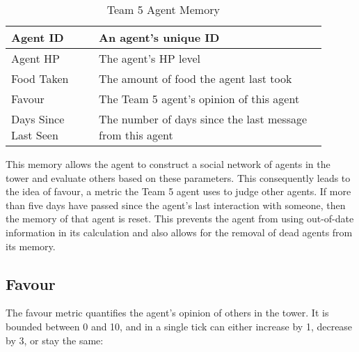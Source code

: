 \begin{table}
    \centering
    \begin{tabular}%
        {| >{\raggedleft\arraybackslash}p{0.25\linewidth} | %
        >{\raggedright\arraybackslash}p{0.65\linewidth} | %
        }
        \hline
        Agent ID & An agent's unique ID\\
        \hline
        Agent HP & The agent's HP level\\
        \hline
        Food Taken & The amount of food the agent last took\\
        \hline
        Favour & The Team 5 agent's opinion of this agent\\
        \hline
        Days Since Last Seen & The number of days since the last message from this agent\\
        \hline
    \end{tabular}
    \caption{Team 5 Agent Memory}
    \label{tab:team5-memory}
\end{table}

This memory allows the agent to construct a social network of agents in the tower and evaluate others based on these parameters. This consequently leads to the idea of favour, a metric the Team 5 agent uses to judge other agents. If more than five days have passed since the agent's last interaction with someone, then the memory of that agent is reset. This prevents the agent from using out-of-date information in its calculation and also allows for the removal of dead agents from its memory.

\subsection*{Favour}\label{sec:team5-favour}
The favour metric quantifies the agent's opinion of others in the tower. It is bounded between 0 and 10, and in a single tick can either increase by 1, decrease by 3, or stay the same:

